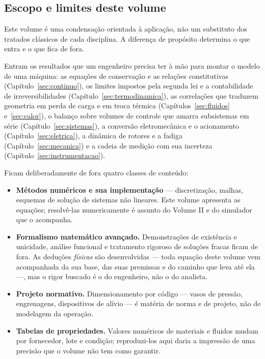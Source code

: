\documentclass[12pt,a4paper]{article}
\numberwithin{equation}{section}
\numberwithin{table}{section}
\numberwithin{figure}{section}
\begin{document}
\subsection{Escopo e limites deste volume}

Este volume é uma condensação orientada à aplicação, não um substituto dos
tratados clássicos de cada disciplina. A diferença de propósito determina o
que entra e o que fica de fora.

Entram os resultados que um engenheiro precisa ter à mão para montar o modelo
de uma máquina: as equações de conservação e as relações constitutivas
(Capítulo~\ref{sec:continuo}), os limites impostos pela segunda lei e a
contabilidade de irreversibilidades (Capítulo~\ref{sec:termodinamica}), as
correlações que traduzem geometria em perda de carga e em troca térmica
(Capítulos~\ref{sec:fluidos} e~\ref{sec:calor}), o balanço sobre volumes de
controle que amarra subsistemas em série (Capítulo~\ref{sec:sistemas}), a
conversão eletromecânica e o acionamento (Capítulo~\ref{sec:eletrica}), a
dinâmica de rotores e a fadiga (Capítulo~\ref{sec:mecanica}) e a cadeia de
medição com sua incerteza (Capítulo~\ref{sec:instrumentacao}).

Ficam deliberadamente de fora quatro classes de conteúdo:

\begin{itemize}
	\item \textbf{Métodos numéricos e sua implementação} --- discretização,
	malhas, esquemas de solução de sistemas não lineares. Este volume apresenta
	as equações; resolvê-las numericamente é assunto do Volume II e do
	simulador que o acompanha.
	\item \textbf{Formalismo matemático avançado.} Demonstrações de
	existência e unicidade, análise funcional e tratamento rigoroso de soluções
	fracas ficam de fora. As deduções \emph{físicas} são desenvolvidas --- toda
	equação deste volume vem acompanhada da sua base, das suas premissas e do
	caminho que leva até ela ---, mas o rigor buscado é o do engenheiro, não o
	do analista.
	\item \textbf{Projeto normativo.} Dimensionamento por código --- vasos de
	pressão, engrenagens, dispositivos de alívio --- é matéria de norma e de
	projeto, não de modelagem da operação.
	\item \textbf{Tabelas de propriedades.} Valores numéricos de materiais e
	fluidos mudam por fornecedor, lote e condição; reproduzi-los aqui daria a
	impressão de uma precisão que o volume não tem como garantir.
\end{itemize}
\end{document}
